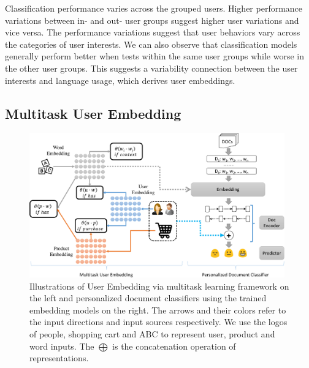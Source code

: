 Classification performance varies across the grouped users.
Higher performance variations between in- and out- user groups suggest higher user variations and vice versa.
The performance variations suggest that user behaviors vary across the categories of user interests. 
We can also observe that classification models generally perform better when tests within the same user groups while worse in the other user groups.
This suggests a variability connection between the user interests and language usage, which derives user embeddings. 





\subsection{Multitask User Embedding}
\label{chap4:subsec:model2}


\begin{figure}[t!]
\centering
\includegraphics[width=0.98\textwidth]{./images/chapter4/uembedding/userEmbedding-diagram.pdf}
\caption{Illustrations of User Embedding via multitask learning framework on the left and personalized document classifiers using the trained embedding models on the right. The arrows and their colors refer to the input directions and input sources respectively. We use the logos of people, shopping cart and ABC to represent user, product and word inputs. The $\bigoplus$ is the concatenation operation of representations.}
\label{chap4:fig:uemb_diagram}
\end{figure}

